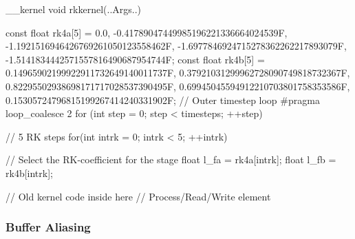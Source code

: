 \begin{CppCode}[caption=Use of Runge-Kutta coefficients inside the RK kernel, frame=tlrb, label=code:rkcoeff]
__kernel void rkkernel(..Args..)
{
    const float rk4a[5] = {0.0, -0.41789047449985196221336664024539F, -1.1921516946426769261050123558462F,  -1.6977846924715278362262217893079F, -1.5141834442571557816490687954744F};
    const float rk4b[5] = {0.14965902199922911732649140011737F, 0.37921031299962728090749818732367F, 0.82295502938698171717028537390495F, 0.69945045594912210703801758353586F, 0.15305724796815199267414240331902F};
    // Outer timestep loop
    #pragma loop_coalesce 2
    for (int step = 0; step < timesteps; ++step)
    {
        // 5 RK steps
        for(int intrk = 0; intrk < 5; ++intrk)
        {
            // Select the RK-coefficient for the stage
            float l_fa = rk4a[intrk];
            float l_fb = rk4b[intrk];

            // Old kernel code inside here
            // Process/Read/Write element
        }
    }
}
\end{CppCode}

\subsubsection*{Buffer Aliasing}

